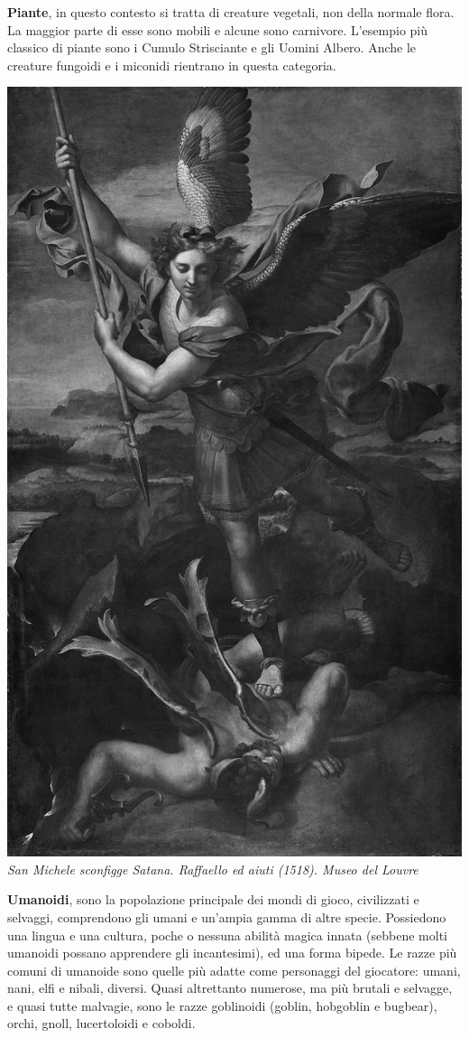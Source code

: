 \begin{multicols}{2}
\smallskip\textbf{Piante}, in questo contesto si tratta di creature vegetali, non della normale flora. La maggior parte di esse sono mobili e alcune sono carnivore. L'esempio più classico di piante sono i Cumulo Strisciante e gli Uomini Albero. Anche le creature fungoidi e i miconidi rientrano in questa categoria.

\begin{center}
\includegraphics[width=0.7\linewidth]{immagini/sanmichelesatana.png}\\
\emph{San Michele sconfigge Satana. Raffaello ed aiuti (1518). Museo del Louvre}
\end{center}

\smallskip\textbf{Umanoidi}, sono la popolazione principale dei mondi di gioco, civilizzati e selvaggi, comprendono gli umani e un'ampia gamma di altre specie. Possiedono una lingua e una cultura, poche o nessuna abilità magica innata (sebbene molti umanoidi possano apprendere gli incantesimi), ed una forma bipede. Le razze più comuni di umanoide sono quelle più adatte come personaggi del giocatore: umani, nani, elfi e nibali, diversi. Quasi altrettanto numerose, ma più brutali e selvagge, e quasi tutte malvagie, sono le razze goblinoidi (goblin, hobgoblin e bugbear), orchi, gnoll, lucertoloidi e coboldi.


\end{multicols}
